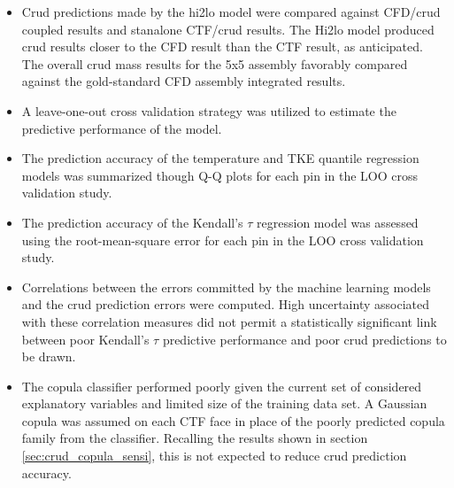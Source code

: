 \begin{itemize}
    \item Crud predictions made by the hi2lo model were compared against CFD/crud coupled results and stanalone CTF/crud results.  The Hi2lo model produced crud results closer to the CFD result than the CTF result, as anticipated.  The overall crud mass results for the 5x5 assembly favorably compared against the gold-standard CFD assembly integrated results.
    \item A leave-one-out cross validation strategy was utilized to estimate the predictive performance of the model.
    \item The prediction accuracy of the temperature and TKE quantile regression models was summarized though Q-Q plots for each pin in the LOO cross validation study.
    \item The prediction accuracy of the Kendall's $\tau$ regression model was assessed using the root-mean-square error for each pin in the LOO cross validation study.  \item Correlations between the errors committed by the machine learning models and the crud prediction errors were computed.  High uncertainty associated with these correlation measures did not permit a statistically significant link between poor Kendall's $\tau$ predictive performance and poor crud predictions to be drawn.
        \item The copula classifier performed poorly given the current set of considered explanatory variables and limited size of the training data set.  A Gaussian copula was assumed on each CTF face in place of the poorly predicted copula family from the classifier.  Recalling the results shown in section \ref{sec:crud_copula_sensi}, this is not expected to reduce crud prediction accuracy.
\end{itemize}
